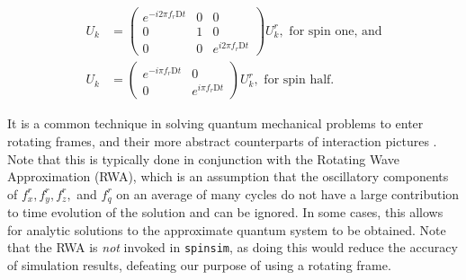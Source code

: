 \documentclass{jors}
\begin{document}
		\begin{align}
			U_k &= \begin{pmatrix}
				e^{-i 2\pi f_r \mathrm{D}t} & 0 & 0\\
				0 & 1 & 0\\
				0 & 0 & e^{i 2\pi f_r \mathrm{D}t}
			\end{pmatrix} U^r_k, \textrm{ for spin one, and}\\
			U_k &= \begin{pmatrix}
				e^{-i \pi f_r \mathrm{D}t} & 0\\
				0 & e^{i \pi f_r \mathrm{D}t}
			\end{pmatrix} U^r_k, \textrm{ for spin half.}
		\end{align}

		It is a common technique in solving quantum mechanical problems to enter rotating frames, and their more abstract counterparts of interaction pictures \cite{j_j_sakurai_jun_john_modern_1994}. Note that this is typically done in conjunction with the Rotating Wave Approximation (RWA), which is an assumption that the oscillatory components of \(f^r_x, f^r_y, f^r_z,\) and \(f^r_q\) on an average of many cycles do not have a large contribution to time evolution of the solution and can be ignored. In some cases, this allows for analytic solutions to the approximate quantum system to be obtained. Note that the RWA is \emph{not} invoked in \texttt{spinsim}, as doing this would reduce the accuracy of simulation results, defeating our purpose of using a rotating frame.
		
		
\end{document}
